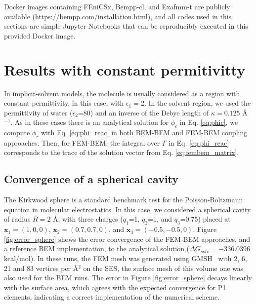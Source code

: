 Docker images containing FEniCSx, Bempp-cl, and Exafmm-t are publicly available (\href{https://bempp.com/installation.html}{https://bempp.com/installation.html}), and all codes used in this sections are simple Jupyter Notebooks that can be reproducibly executed in this provided Docker image.

\section*{\sffamily \Large Results with constant permitivitty}

In implicit-solvent models, the molecule is usually considered as a region with constant permittivity, in this case, with $\epsilon_1=2$.
In the solvent region, we used the permittivity of water ($\epsilon_2$=80) and an inverse of the Debye length of $\kappa=0.125$ \AA$^{-1}$.
As in these cases there is an analytical solution for $\phi_c$ in Eq. \eqref{eq:phic}, we compute $\phi_r$ with Eq. \eqref{eq:phi_reac} in both BEM-BEM and FEM-BEM coupling approaches. Then, for FEM-BEM, the integral over $\Gamma$ in Eq. \eqref{eq:phi_reac} corresponds to the trace of the solution vector from Eq. \eqref{eq:fembem_matrix}.

\subsection*{\sffamily \large Convergence of a spherical cavity}

The Kirkwood sphere \cite{Kirkwood1934} is a standard benchmark test for the Poisson-Boltzmann equation in molecular electrostatics. 
In this case, we considered a spherical cavity of radius $R=2$ \AA, with three charges ($q_1$=1, $q_2$=1, and $q_3$=0.75) placed at $\mathbf{x}_1=(1,0,0)$, $\mathbf{x}_2=(0.7,0.7,0)$, and $\mathbf{x}_3=(-0.5,-0.5,0)$.
Figure \ref{fig:error_sphere} shows the error convergence of the FEM-BEM approaches, and a reference BEM implementation, to the analytical solution ($\Delta G_{solv}= -336.0396$ kcal/mol). 
In these runs, the FEM mesh was generated using GMSH~\cite{geuzaine2009gmsh} 
with %
2, 6, 21 and 83 vertices per \AA$^2$ on the SES, the surface mesh of this volume one was also used for the BEM runs. 
The error in Figure \ref{fig:error_sphere} decays linearly with the surface area, which agrees with the expected convergence for P1 elements, indicating a correct implementation of the numerical scheme. 


